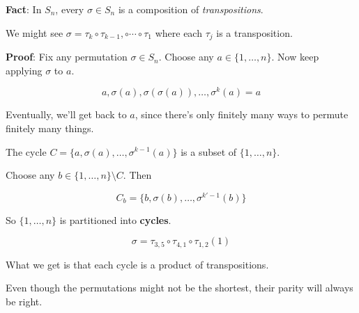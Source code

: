 \documentclass[12pt]{article}
\begin{document}


  {\bf Fact}: In $S_n$, every $\sigma \in S_n$ is a composition of
  {\it transpositions}.

  We might see $\sigma = \tau_k \circ \tau_{k - 1}, \circ \cdots \circ \tau_1$
  where each $\tau_j$ is a transposition.

  {\bf Proof}: Fix any permutation $\sigma \in S_n$. Choose any $a \in \{1,
  \dots, n\}$. Now keep applying $\sigma$ to $a$.

  \[
    a, \sigma(a), \sigma(\sigma(a)), \dots, \sigma^k(a) = a
  \]

  Eventually, we'll get back to $a$, since there's only finitely many ways to
  permute finitely many things.

  The cycle $C = \{a, \sigma(a), \dots, \sigma^{k - 1}(a)\}$ is a subset of
  $\{1, \dots, n\}$.

  Choose any $b \in \{1, \dots, n\} \setminus C$. Then

  \[
    C_b = \{b, \sigma(b), \dots, \sigma^{k' - 1}(b)\}
  \]

  So $\{1, \dots, n\}$ is partitioned into {\bf cycles}.

  \[
    \sigma = \tau_{3, 5} \circ \tau_{4, 1} \circ \tau_{1, 2} (1)
  \]

  What we get is that each cycle is a product of transpositions.

  Even though the permutations might not be the shortest, their parity will
  always be right.


\end{document}
